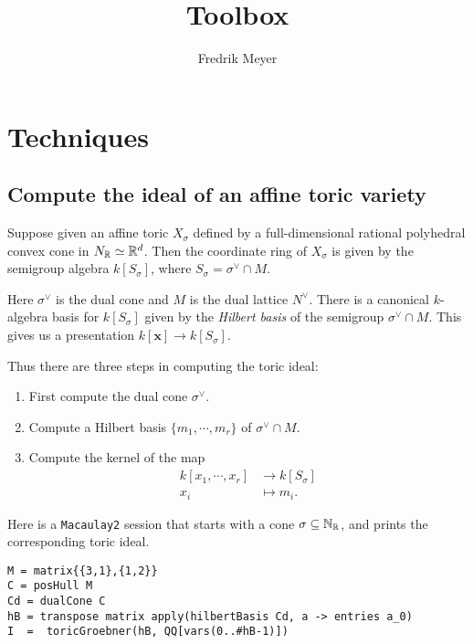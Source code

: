\documentclass[11pt, english]{article}
\title{Toolbox}
\author{Fredrik Meyer}
\begin{document}
\maketitle 

\section{Techniques}
\subsection{Compute the ideal of an affine toric variety}

Suppose given an affine toric $X_\sigma$ defined by a full-dimensional rational polyhedral convex cone in $N_{\mathbb{R}} \simeq \mathbb{R}^d$. Then the coordinate ring of $X_\sigma$ is given by the semigroup algebra $k[S_\sigma]$, where $S_\sigma = \sigma^\vee \cap M$.

Here $\sigma^\vee$ is the dual cone and $M$ is the dual lattice $N^\vee$. There is a canonical $k$-algebra basis for $k[S_\sigma]$ given by the \emph{Hilbert basis} of the semigroup $\sigma^\vee \cap M$. This gives us a presentation $k[\mathbf x] \to k[S_\sigma]$.

Thus there are three steps in computing the toric ideal:
\begin{enumerate}
\item First compute the dual cone $\sigma^\vee$.
\item Compute a Hilbert basis $\{m_1,\cdots,m_r\}$ of $\sigma^\vee \cap M$.
\item Compute the kernel of the map 
  \begin{align*}
    k[x_1,\cdots, x_r] &\to k[S_\sigma]  \\
 x_i &\mapsto m_i.
  \end{align*}
\end{enumerate}

Here is a \verb|Macaulay2| session that starts with a cone $\sigma \subseteq \mathbb{N}_{\mathbb{R}}$, and prints the corresponding toric ideal.

\begin{verbatim}
M = matrix{{3,1},{1,2}}
C = posHull M
Cd = dualCone C
hB = transpose matrix apply(hilbertBasis Cd, a -> entries a_0)
I  =  toricGroebner(hB, QQ[vars(0..#hB-1)])
\end{verbatim}
\end{document}
